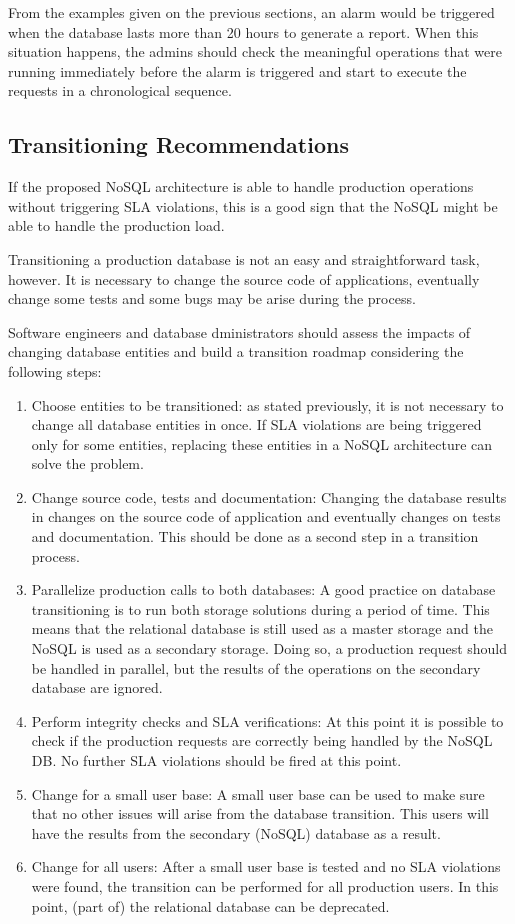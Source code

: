 From the examples given on the previous sections, an alarm would be triggered when the database lasts more than 20 hours to generate a report. When this situation happens, the admins should check the meaningful operations that were running immediately before the alarm is triggered and start to execute the requests in a chronological sequence. 

\subsection{Transitioning Recommendations}

If the proposed NoSQL architecture is able to handle production operations without triggering SLA violations, this is a good sign that the NoSQL might be able to handle the production load.

Transitioning a production database is not an easy and straightforward task, however. It is necessary to change the source code of applications, eventually change some tests and some bugs may be arise during the process. 

Software engineers and database dministrators should assess the impacts of changing database entities and build a transition roadmap considering the following steps:

\begin{enumerate}
\item{Choose entities to be transitioned: as stated previously, it is not necessary to change all database entities in once. If SLA violations are being triggered only for some entities, replacing these entities in a NoSQL architecture can solve the problem.}
\item{Change source code, tests and documentation: Changing the database results in changes on the source code of application and eventually changes on tests and documentation. This should be done as a second step in a transition process. }
\item{Parallelize production calls to both databases: A good practice on database transitioning is to run both storage solutions during a period of time. This means that the relational database is still used as a master storage and the NoSQL is used as a secondary storage. Doing so, a production request should be handled in parallel, but the results of the operations on the secondary database are ignored.}
\item{Perform integrity checks and SLA verifications: At this point it is possible to check if the production requests are correctly being handled by the NoSQL DB. No further SLA violations should be fired at this point.}
\item{Change for a small user base: A small user base can be used to make sure that no other issues will arise from the database transition. This users will have the results from the secondary (NoSQL) database as a result.  }
\item{Change for all users: After a small user base is tested and no SLA violations were found, the transition can be performed for all production users. In this point, (part of) the relational database can be deprecated.}

\end{enumerate}

